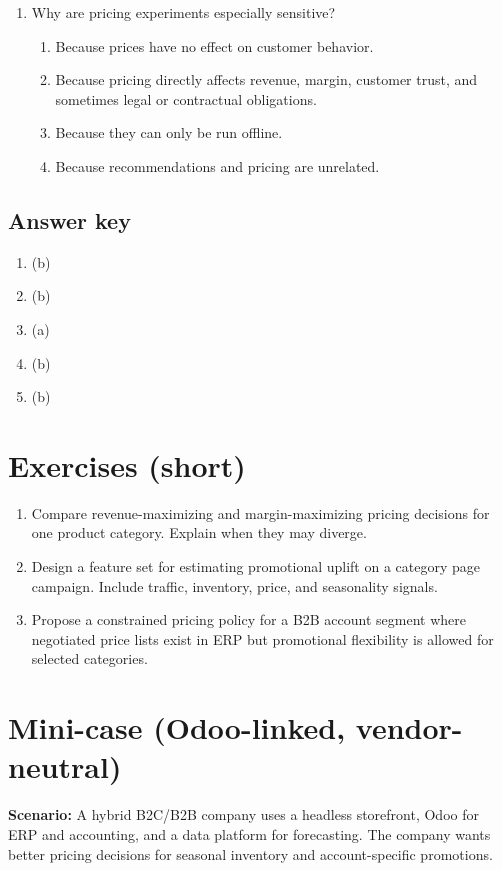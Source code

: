 \begin{enumerate}
  \item Why are pricing experiments especially sensitive?
  \begin{enumerate}
    \item Because prices have no effect on customer behavior.
    \item Because pricing directly affects revenue, margin, customer trust, and sometimes legal or contractual obligations.
    \item Because they can only be run offline.
    \item Because recommendations and pricing are unrelated.
  \end{enumerate}
\end{enumerate}

\subsection*{Answer key}
\begin{enumerate}
  \item (b)
  \item (b)
  \item (a)
  \item (b)
  \item (b)
\end{enumerate}

\section{Exercises (short)}
\begin{enumerate}
  \item Compare revenue-maximizing and margin-maximizing pricing decisions for one product category. Explain when they may diverge.
  \item Design a feature set for estimating promotional uplift on a category page campaign. Include traffic, inventory, price, and seasonality signals.
  \item Propose a constrained pricing policy for a B2B account segment where negotiated price lists exist in ERP but promotional flexibility is allowed for selected categories.
\end{enumerate}

\section{Mini-case (Odoo-linked, vendor-neutral)}
\textbf{Scenario:} A hybrid B2C/B2B company uses a headless storefront, Odoo for ERP and accounting, and a data platform for forecasting. The company wants better pricing decisions for seasonal inventory and account-specific promotions.

